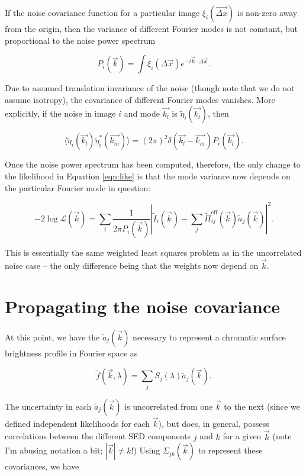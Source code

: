 \documentclass{article}
\begin{document}
If the noise covariance function for a particular image $\xi_i(\vec{\Delta x})$ is non-zero away
from the origin, then the variance of different Fourier modes is not constant, but proportional to
the noise power spectrum

\begin{equation}
  P_i(\vec{k}) = \int \xi_i(\Delta \vec{x}) e^{-i \vec{k}\cdot\Delta\vec{x}}.
\end{equation}

Due to assumed translation invariance of the noise (though note that we do not assume isotropy), the
covariance of different Fourier modes vanishes.  More explicitly, if the noise in image $i$ and mode
$\vec{k_l}$ is $\tilde\eta_i(\vec{k_l})$, then

\begin{equation}
  \langle\tilde\eta_i(\vec{k_l})\tilde\eta_i^*(\vec{k_m})\rangle = (2 \pi)^2 \delta(\vec{k_l} - \vec{k_m})P_i(\vec{k_l}).
\end{equation}

Once the noise power spectrum has been computed, therefore, the only change to the likelihood in
Equation \ref{eqn:like} is that the mode variance now depends on the particular Fourier mode in
question:

\begin{equation}
    \label{eqn:likecorr}
    -2 \log \mathcal{L}(\vec{k}) = \sum_i\frac{1}{2 \pi P_i(\vec{k})}\left|\tilde{I}_i(\vec{k}) - \sum_j \tilde{\Pi}^\mathrm{eff}_{ij}(\vec{k}) \tilde{a}_j(\vec{k})\right|^2.
\end{equation}

This is essentially the same weighted least squares problem as in the uncorrelated noise case -- the
only difference being that the weights now depend on $\vec{k}$.

\section{Propagating the noise covariance}

At this point, we have the $\tilde{a}_j(\vec{k})$ necessary to represent a chromatic surface
brightness profile in Fourier space as

\begin{equation}
  \tilde{f}(\vec{k}, \lambda) = \sum_j S_j(\lambda) \tilde{a}_j(\vec{k}).
\end{equation}

The uncertainty in each $\tilde{a}_j(\vec{k})$ is uncorrelated from one $\vec{k}$ to the next (since
we defined independent likelihoods for each $\vec{k}$), but does, in general, possess correlations
between the different SED components $j$ and $k$ for a given $\vec{k}$ (note I'm abusing notation a
bit; $|\vec{k}| \ne k$!)  Using $\Sigma_{jk}(\vec{k})$ to represent these covariances, we have
\end{document}
